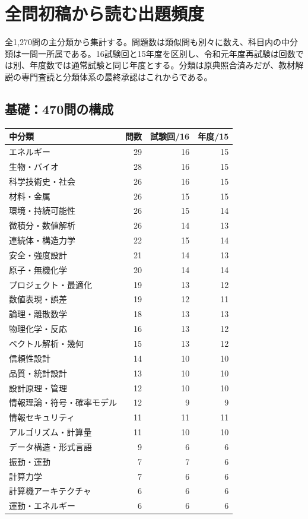 \chapter{全問初稿から読む出題頻度}
全1,270問の主分類から集計する。問題数は類似問も別々に数え、科目内の中分類は一問一所属である。16試験回と15年度を区別し、令和元年度再試験は回数では別、年度数では通常試験と同じ年度とする。分類は原典照合済みだが、教材解説の専門査読と分類体系の最終承認はこれからである。
\section{基礎：470問の構成}
\begin{longtable}{p{.57\linewidth}rrr}
中分類 & 問数 & 試験回/16 & 年度/15\\\hline
エネルギー & 29 & 16 & 15\\
生物・バイオ & 28 & 16 & 15\\
科学技術史・社会 & 26 & 16 & 15\\
材料・金属 & 26 & 15 & 15\\
環境・持続可能性 & 26 & 15 & 14\\
微積分・数値解析 & 26 & 14 & 13\\
連続体・構造力学 & 22 & 15 & 14\\
安全・強度設計 & 21 & 14 & 13\\
原子・無機化学 & 20 & 14 & 14\\
プロジェクト・最適化 & 19 & 13 & 12\\
数値表現・誤差 & 19 & 12 & 11\\
論理・離散数学 & 18 & 13 & 13\\
物理化学・反応 & 16 & 13 & 12\\
ベクトル解析・幾何 & 15 & 13 & 12\\
信頼性設計 & 14 & 10 & 10\\
品質・統計設計 & 13 & 10 & 10\\
設計原理・管理 & 12 & 10 & 10\\
情報理論・符号・確率モデル & 12 & 9 & 9\\
情報セキュリティ & 11 & 11 & 11\\
アルゴリズム・計算量 & 11 & 10 & 10\\
データ構造・形式言語 & 9 & 6 & 6\\
振動・運動 & 7 & 7 & 6\\
計算力学 & 7 & 6 & 6\\
計算機アーキテクチャ & 6 & 6 & 6\\
運動・エネルギー & 6 & 6 & 6\\

\end{longtable}
